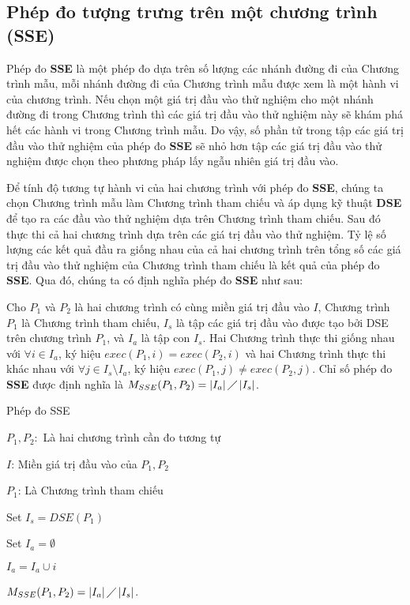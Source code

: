 \subsection{Phép đo tượng trưng trên một chương trình (SSE)}
Phép đo \textbf{SSE} là một phép đo dựa trên số lượng các nhánh đường đi của Chương trình mẫu, mỗi nhánh đường đi của Chương trình mẫu được xem là một hành vi của chương trình. Nếu chọn một giá trị đầu vào thử nghiệm cho một nhánh đường đi trong Chương trình thì các giá trị đầu vào thử nghiệm này sẽ khám phá hết các hành vi trong Chương trình mẫu. Do vậy, số phần tử trong tập các giá trị đầu vào thử nghiệm của phép đo \textbf{SSE} sẽ nhỏ hơn tập các giá trị đầu vào thử nghiệm được chọn theo phương pháp lấy ngẫu nhiên giá trị đầu vào. 

Để tính độ tương tự hành vi của hai chương trình với phép đo \textbf{SSE}, chúng ta chọn Chương trình mẫu làm Chương trình tham chiếu và áp dụng kỹ thuật \textbf{DSE} để tạo ra các đầu vào thử nghiệm dựa trên Chương trình tham chiếu. Sau đó thực thi cả hai chương trình dựa trên các giá trị đầu vào thử nghiệm. Tỷ lệ số lượng các kết quả đầu ra giống nhau của cả hai chương trình trên tổng số các giá trị đầu vào thử nghiệm của Chương trình tham chiếu là kết quả của phép đo \textbf{SSE}. Qua đó, chúng ta có định nghĩa phép đo \textbf{SSE} như sau:

\begin{definition}
	Cho $P_{1}$ và $P_{2}$ là hai chương trình có cùng miền giá trị đầu vào $I$, Chương trình $P_{1}$ là Chương trình tham chiếu, $I_{s}$ là tập các giá trị đầu vào được tạo bởi DSE trên chương trình $P_{1}$, và $I_{a}$ là tập con $I_{s}$. Hai Chương trình thực thi giống nhau với $\forall i \in I_{a}$, ký hiệu $exec(P_{1}, i) = exec(P_{2}, i)$ và hai Chương trình thực thi khác nhau với $\forall j \in I_{s} \setminus I_{a}$, ký hiệu $exec(P_{1}, j) \neq exec(P_{2}, j)$. Chỉ số phép đo \textbf{SSE} được định nghĩa là $M_{SSE}(P_{1}, P_{2}) = \left|I_{a}\right| \diagup \left|I_{s}\right| $.
\end{definition}

\begin{algorithm}[H]
	\caption{Phép đo SSE}
	\begin{algorithmic}	
		\item $P_{1}, P_{2}:$ Là hai chương trình cần đo tương tự
		\item $I$: Miền giá trị đầu vào của $P_{1}, P_{2}$
		\item $P_{1}$: Là Chương trình tham chiếu
		\item Set $I_{s} = DSE(P_{1})$ 
		\item Set $I_{a} = \emptyset$ 
		  
		
		\State $I_{a} = I_{a} \cup i$		
		\EndIf
		\EndWhile
		\item $M_{SSE}(P_{1}, P_{2}) = \left|I_{a}\right| \diagup \left|I_{s}\right| $. 
	\end{algorithmic}
\end{algorithm}


